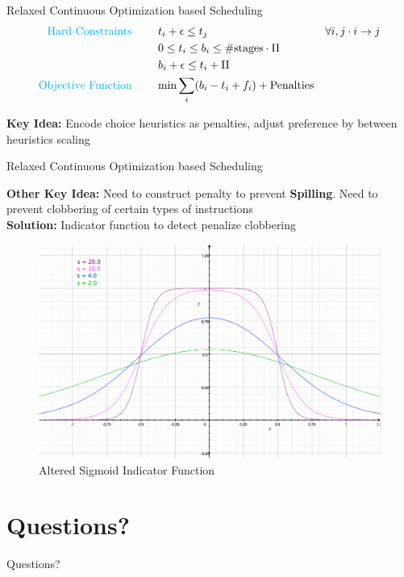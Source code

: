 \documentclass{beamer}
\begin{document}
\begin{darkframes}
\begin{frame}{Relaxed Continuous Optimization based Scheduling}
    \begin{align}
    \text{\color{cyan} Hard Constraints \qquad}  & t_i + \epsilon \leq t_j \qquad & \forall i,j \cdot i \rightarrow j \\
								 & 0 \leq t_i \leq b_i \leq \#\text{stages} \cdot \textrm{II}  & \\
								 & b_i + \epsilon \leq t_i + \textrm{II} \\
    \text{\color{cyan} Objective Function \qquad}   & \text{min} \sum_{i} (b_i - t_i + f_i) + \text{Penalties}
    \end{align}
    
    {\bf \color{green} Key Idea:} Encode choice heuristics as penalties, adjust preference by between heuristics scaling
\end{frame}

\begin{frame}{Relaxed Continuous Optimization based Scheduling}

    {\bf \color{green} Other Key Idea:} Need to construct penalty to prevent {\bf \color{cyan} Spilling}. Need to prevent clobbering of certain types of instructions \\
    {\bf \color{green} Solution:} Indicator function to detect penalize clobbering
    \begin{figure}
        \includegraphics[scale=0.2]{figures/sigmoid}
        \caption{Altered Sigmoid Indicator Function}
    \end{figure}

\end{frame}

    \section{Questions?}                           %
    \begin{frame}{Questions?}
    \end{frame}
    
  \end{darkframes}
\end{document}
